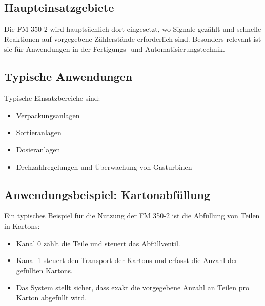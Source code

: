 \subsection{Haupteinsatzgebiete}

Die FM 350-2 wird hauptsächlich dort eingesetzt, wo Signale gezählt und schnelle Reaktionen auf vorgegebene Zählerstände erforderlich sind. Besonders relevant ist sie für Anwendungen in der Fertigungs- und Automatisierungstechnik.

\subsection{Typische Anwendungen}

Typische Einsatzbereiche sind:
\begin{itemize}
    \item Verpackungsanlagen
    \item Sortieranlagen
    \item Dosieranlagen
    \item Drehzahlregelungen und Überwachung von Gasturbinen
\end{itemize}

\subsection{Anwendungsbeispiel: Kartonabfüllung}

Ein typisches Beispiel für die Nutzung der FM 350-2 ist die Abfüllung von Teilen in Kartons:

\begin{itemize}
    \item Kanal 0 zählt die Teile und steuert das Abfüllventil.
    \item Kanal 1 steuert den Transport der Kartons und erfasst die Anzahl der gefüllten Kartons.
    \item Das System stellt sicher, dass exakt die vorgegebene Anzahl an Teilen pro Karton abgefüllt wird.
\end{itemize}


